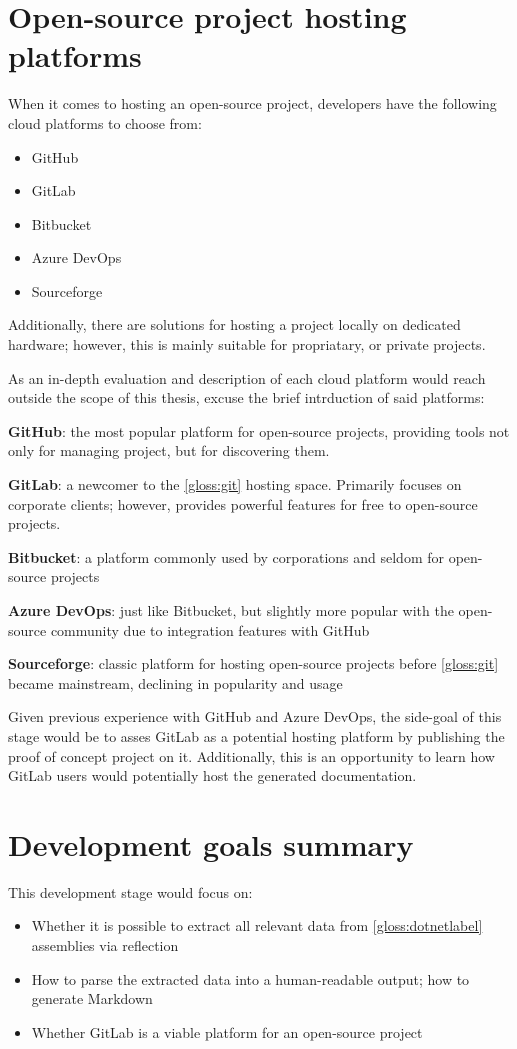 \section{Open-source project hosting platforms}
When it comes to hosting an open-source project, developers have the following cloud platforms to choose from:
\begin{itemize}
    \item GitHub
    \item GitLab
    \item Bitbucket
    \item Azure DevOps
    \item Sourceforge
\end{itemize}

Additionally, there are solutions for hosting a project locally on dedicated hardware; however, this is mainly suitable for propriatary, or private projects.

As an in-depth evaluation and description of each cloud platform would reach outside the scope of this thesis, excuse the brief intrduction of said platforms:

\textbf{GitHub}: the most popular platform for open-source projects, providing tools not only for managing project, but for discovering them.

\textbf{GitLab}: a newcomer to the \ref{gloss:git} hosting space. Primarily focuses on corporate clients; however, provides powerful features for free to open-source projects.

\textbf{Bitbucket}: a platform commonly used by corporations and seldom for open-source projects

\textbf{Azure DevOps}: just like Bitbucket, but slightly more popular with the open-source community due to integration features with GitHub

\textbf{Sourceforge}: classic platform for hosting open-source projects before \ref{gloss:git} became mainstream, declining in popularity and usage

Given previous experience with GitHub and Azure DevOps, the side-goal of this stage would be to asses GitLab as a potential hosting platform by publishing the proof of concept project on it. Additionally, this is an opportunity to learn how GitLab users would potentially host the generated documentation.

\section{Development goals summary}
This development stage would focus on:
\begin{itemize}
    \item Whether it is possible to extract all relevant data from \ref{gloss:dotnetlabel} assemblies via reflection
    \item How to parse the extracted data into a human-readable output; how to generate Markdown
    \item Whether GitLab is a viable platform for an open-source project
\end{itemize}

